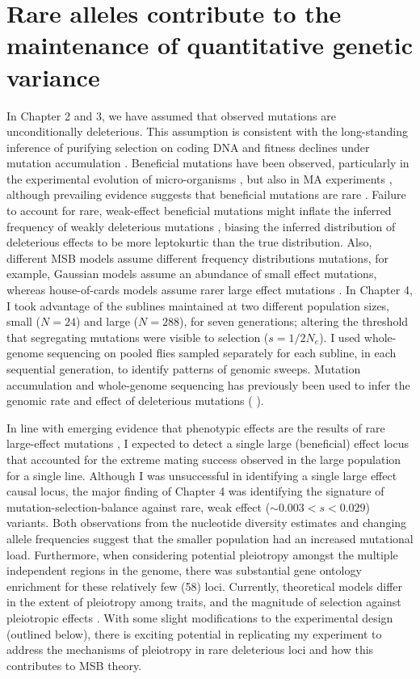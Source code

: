 \section{Rare alleles contribute to the maintenance of quantitative genetic variance}
In Chapter 2 and 3, we have assumed that observed mutations are unconditionally deleterious. This assumption is consistent with the long-standing inference of purifying selection on coding DNA \citep{Kimu83, Ohta92,Li97} and fitness declines under mutation accumulation \citep{Hall09}. Beneficial mutations have been observed, particularly in the experimental evolution of micro-organisms
\citep[e.g.,][]{Jose04}, but also in MA experiments \citep[e.g.,][]{Shaw00}, although prevailing evidence suggests that beneficial mutations are rare \citep{Bata14, Heil14, Rock15}. Failure to account for rare, weak-effect beneficial mutations might inflate the inferred frequency of weakly deleterious mutations \citep{Tata17}, biasing the inferred distribution of deleterious effects to be more leptokurtic than the true distribution. Also, different MSB models assume different frequency distributions mutations, for example, Gaussian models assume an abundance of small effect mutations, whereas house-of-cards models assume rarer large effect mutations \citep{Land75, Ture84, Ture85, Wals18c28}. In Chapter 4, I took advantage of the sublines maintained at two different population sizes, small ($N =24$) and large ($N = 288$), for seven generations; altering the threshold that segregating mutations were visible to selection ($s = 1/2N_e$). I used whole-genome sequencing on pooled flies sampled separately for each subline, in each sequential generation, to identify patterns of genomic sweeps. Mutation accumulation and whole-genome sequencing has previously been used to infer the genomic rate and effect of deleterious mutations (\citealp[e.g.,][]{Keig09a, Huan16} \citealp[reviewed by][]{Katj19}). 

In line with emerging evidence that phenotypic effects are the results of rare large-effect mutations \citep{Mack92A, Davi99, Heil14, McGu14b}, I expected to detect a single large (beneficial) effect locus that accounted for the extreme mating success observed in the large population for a single line. Although I was unsuccessful in identifying a single large effect causal locus, the major finding of Chapter 4 was identifying the signature of mutation-selection-balance against rare, weak effect ($\sim 0.003 < s < 0.029$) variants. Both observations from the nucleotide diversity estimates and changing allele frequencies suggest that the smaller population had an increased mutational load. Furthermore, when considering potential pleiotropy amongst the multiple independent regions in the genome, there was substantial gene ontology enrichment for these relatively few (58) loci. Currently, theoretical models differ in the extent of pleiotropy among traits, and the magnitude of selection against pleiotropic effects \citep{Ture85, Bart90,John05}. With some slight modifications to the experimental design (outlined below), there is exciting potential in replicating my experiment to address the mechanisms of pleiotropy in rare deleterious loci and how this contributes to MSB theory. \par


